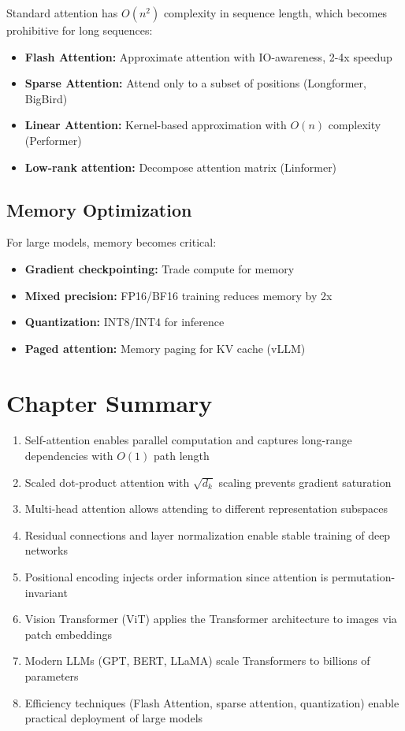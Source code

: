 Standard attention has $O(n^2)$ complexity in sequence length, which becomes prohibitive for long sequences:

\begin{itemize}
    \item \textbf{Flash Attention:} Approximate attention with IO-awareness, 2-4x speedup
    \item \textbf{Sparse Attention:} Attend only to a subset of positions (Longformer, BigBird)
    \item \textbf{Linear Attention:} Kernel-based approximation with $O(n)$ complexity (Performer)
    \item \textbf{Low-rank attention:} Decompose attention matrix (Linformer)
\end{itemize}

\subsection{Memory Optimization}

For large models, memory becomes critical:
\begin{itemize}
    \item \textbf{Gradient checkpointing:} Trade compute for memory
    \item \textbf{Mixed precision:} FP16/BF16 training reduces memory by 2x
    \item \textbf{Quantization:} INT8/INT4 for inference
    \item \textbf{Paged attention:} Memory paging for KV cache (vLLM)
\end{itemize}

\section{Chapter Summary}

\begin{enumerate}
    \item Self-attention enables parallel computation and captures long-range dependencies with $O(1)$ path length
    \item Scaled dot-product attention with $\sqrt{d_k}$ scaling prevents gradient saturation
    \item Multi-head attention allows attending to different representation subspaces
    \item Residual connections and layer normalization enable stable training of deep networks
    \item Positional encoding injects order information since attention is permutation-invariant
    \item Vision Transformer (ViT) applies the Transformer architecture to images via patch embeddings
    \item Modern LLMs (GPT, BERT, LLaMA) scale Transformers to billions of parameters
    \item Efficiency techniques (Flash Attention, sparse attention, quantization) enable practical deployment of large models
\end{enumerate}

